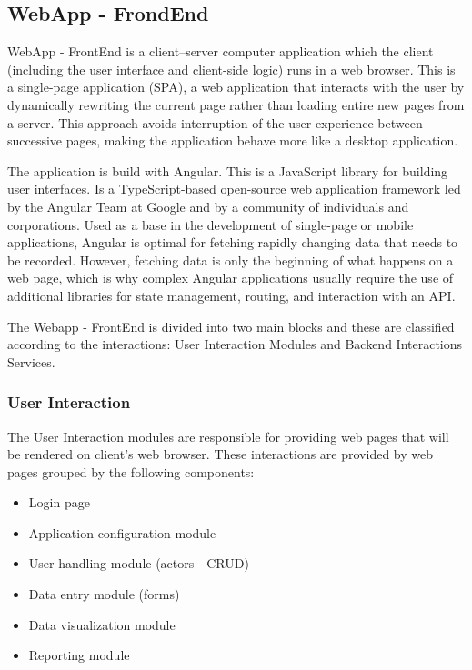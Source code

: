 \subsection{WebApp - FrondEnd}\label{sec:WebAppFrondEnd}
WebApp - FrontEnd is a client–server computer application which the client (including the user interface and client-side logic) runs in a web browser. This is a single-page application (SPA), a web application that interacts with the user by dynamically rewriting the current page rather than loading entire new pages from a server. This approach avoids interruption of the user experience between successive pages, making the application behave more like a desktop application.

The application is build with Angular. This is a JavaScript library for building user interfaces. Is a TypeScript-based open-source web application framework led by the Angular Team at Google and by a community of individuals and corporations. Used as a base in the development of single-page or mobile applications, Angular is optimal for fetching rapidly changing data that needs to be recorded. However, fetching data is only the beginning of what happens on a web page, which is why complex Angular applications usually require the use of additional libraries for state management, routing, and interaction with an API.

The Webapp - FrontEnd is divided into two main blocks and these are classified according to the interactions: User Interaction Modules and Backend Interactions Services.

\subsubsection{User Interaction}\label{sec:UserInteraction}
The User Interaction modules are responsible for providing web pages that will be rendered on client’s web browser. These interactions are provided by web pages grouped by the following components:

\begin{itemize}
\item Login page
\item Application configuration module
\item User handling module (actors - CRUD)
\item Data entry module (forms)
\item Data visualization module
\item Reporting module
\end{itemize}

